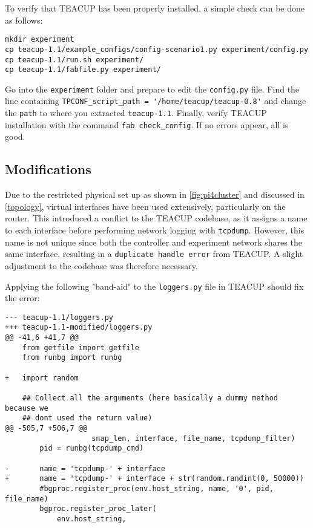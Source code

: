 To verify that TEACUP has been properly installed, a simple check can be done as follows:

\begin{verbatim}
mkdir experiment
cp teacup-1.1/example_configs/config-scenario1.py experiment/config.py
cp teacup-1.1/run.sh experiment/
cp teacup-1.1/fabfile.py experiment/
\end{verbatim}

Go into the \lstinline{experiment} folder and prepare to edit the \lstinline{config.py} file. Find the line containing \lstinline{TPCONF_script_path = '/home/teacup/teacup-0.8'} and change the \lstinline{path} to where you extracted \lstinline{teacup-1.1}. Finally, verify TEACUP installation with the command \lstinline{fab check_config}. If no errors appear, all is good.


\subsection{Modifications}

Due to the restricted physical set up as shown in \ref{fig:pi4cluster} and discussed in \ref{topology}, virtual interfaces have been used extensively, particularly on the router. This introduced a conflict to the TEACUP codebase, as it assigns a name to each interface before performing network logging with \lstinline{tcpdump}. However, this name is not unique since both the controller and experiment network shares the same interface, resulting in a \lstinline{duplicate handle error} from TEACUP. A slight adjustment to the codebase was therefore necessary.

Applying the following "band-aid" to the \lstinline{loggers.py} file in TEACUP should fix the error:

\begin{verbatim}
--- teacup-1.1/loggers.py
+++ teacup-1.1-modified/loggers.py
@@ -41,6 +41,7 @@
    from getfile import getfile
    from runbg import runbg
    
+   import random
    
    ## Collect all the arguments (here basically a dummy method because we
    ## dont used the return value)
@@ -505,7 +506,7 @@
                    snap_len, interface, file_name, tcpdump_filter)
        pid = runbg(tcpdump_cmd)
    
-       name = 'tcpdump-' + interface
+       name = 'tcpdump-' + interface + str(random.randint(0, 50000))
        #bgproc.register_proc(env.host_string, name, '0', pid, file_name)
        bgproc.register_proc_later(
            env.host_string,
\end{verbatim}

